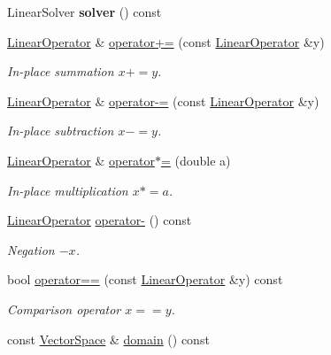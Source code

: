 \begin{DoxyCompactItemize}
\item 
\hypertarget{classSpacy_1_1dealII_1_1LinearOperator_a54cb619f07f65504274d0b15947f71d7}{\-Linear\-Solver {\bfseries solver} () const }\label{classSpacy_1_1dealII_1_1LinearOperator_a54cb619f07f65504274d0b15947f71d7}

\item 
\hyperlink{classSpacy_1_1dealII_1_1LinearOperator}{\-Linear\-Operator} \& \hyperlink{classSpacy_1_1dealII_1_1LinearOperator_ae3cb488002c308958553cc46c5798ba1}{operator+=} (const \hyperlink{classSpacy_1_1dealII_1_1LinearOperator}{\-Linear\-Operator} \&y)
\begin{DoxyCompactList}\small\item\em \-In-\/place summation $ x+=y$. \end{DoxyCompactList}\item 
\hyperlink{classSpacy_1_1dealII_1_1LinearOperator}{\-Linear\-Operator} \& \hyperlink{classSpacy_1_1dealII_1_1LinearOperator_a9ba5046c851eee8478417862900abbfa}{operator-\/=} (const \hyperlink{classSpacy_1_1dealII_1_1LinearOperator}{\-Linear\-Operator} \&y)
\begin{DoxyCompactList}\small\item\em \-In-\/place subtraction $ x-=y$. \end{DoxyCompactList}\item 
\hyperlink{classSpacy_1_1dealII_1_1LinearOperator}{\-Linear\-Operator} \& \hyperlink{classSpacy_1_1dealII_1_1LinearOperator_aae592542ae9561d65d9e34965ee4ad5b}{operator$\ast$=} (double a)
\begin{DoxyCompactList}\small\item\em \-In-\/place multiplication $ x*=a$. \end{DoxyCompactList}\item 
\hyperlink{classSpacy_1_1dealII_1_1LinearOperator}{\-Linear\-Operator} \hyperlink{classSpacy_1_1dealII_1_1LinearOperator_a9a6024e12467d8c555ea7204de807e40}{operator-\/} () const 
\begin{DoxyCompactList}\small\item\em \-Negation $ -x$. \end{DoxyCompactList}\item 
bool \hyperlink{classSpacy_1_1dealII_1_1LinearOperator_abe5eb63972cc6ee44c9e5c42f8b56b46}{operator==} (const \hyperlink{classSpacy_1_1dealII_1_1LinearOperator}{\-Linear\-Operator} \&y) const 
\begin{DoxyCompactList}\small\item\em \-Comparison operator $ x==y$. \end{DoxyCompactList}\item 
\hypertarget{classSpacy_1_1OperatorBase_a2588f9b3e0188820c4c494e63293dc6f}{const \hyperlink{classSpacy_1_1VectorSpace}{\-Vector\-Space} \& \hyperlink{classSpacy_1_1OperatorBase_a2588f9b3e0188820c4c494e63293dc6f}{domain} () const }\label{classSpacy_1_1OperatorBase_a2588f9b3e0188820c4c494e63293dc6f}


\end{DoxyCompactItemize}
